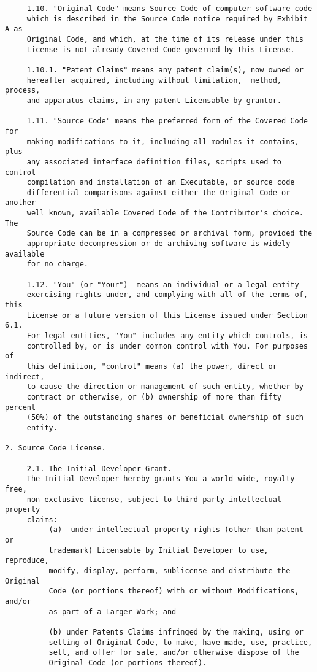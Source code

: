 \begin{verbatim}
     1.10. "Original Code" means Source Code of computer software code
     which is described in the Source Code notice required by Exhibit A as
     Original Code, and which, at the time of its release under this
     License is not already Covered Code governed by this License.

     1.10.1. "Patent Claims" means any patent claim(s), now owned or
     hereafter acquired, including without limitation,  method, process,
     and apparatus claims, in any patent Licensable by grantor.

     1.11. "Source Code" means the preferred form of the Covered Code for
     making modifications to it, including all modules it contains, plus
     any associated interface definition files, scripts used to control
     compilation and installation of an Executable, or source code
     differential comparisons against either the Original Code or another
     well known, available Covered Code of the Contributor's choice. The
     Source Code can be in a compressed or archival form, provided the
     appropriate decompression or de-archiving software is widely available
     for no charge.

     1.12. "You" (or "Your")  means an individual or a legal entity
     exercising rights under, and complying with all of the terms of, this
     License or a future version of this License issued under Section 6.1.
     For legal entities, "You" includes any entity which controls, is
     controlled by, or is under common control with You. For purposes of
     this definition, "control" means (a) the power, direct or indirect,
     to cause the direction or management of such entity, whether by
     contract or otherwise, or (b) ownership of more than fifty percent
     (50%) of the outstanding shares or beneficial ownership of such
     entity.

2. Source Code License.

     2.1. The Initial Developer Grant.
     The Initial Developer hereby grants You a world-wide, royalty-free,
     non-exclusive license, subject to third party intellectual property
     claims:
          (a)  under intellectual property rights (other than patent or
          trademark) Licensable by Initial Developer to use, reproduce,
          modify, display, perform, sublicense and distribute the Original
          Code (or portions thereof) with or without Modifications, and/or
          as part of a Larger Work; and

          (b) under Patents Claims infringed by the making, using or
          selling of Original Code, to make, have made, use, practice,
          sell, and offer for sale, and/or otherwise dispose of the
          Original Code (or portions thereof).


\end{verbatim}
